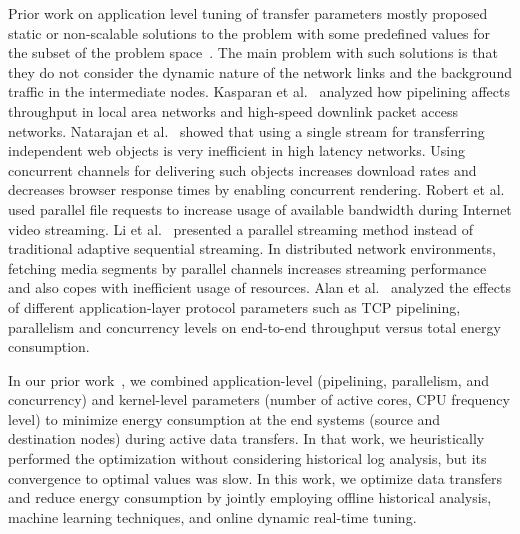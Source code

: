 \documentclass[conference]{IEEEtran}
\begin{document}
Prior work on application level tuning of transfer parameters mostly proposed static or non-scalable solutions to the problem with some predefined values for the subset of the problem space~\cite{R_Hacker02, R_Dinda05}. The main problem with such solutions is that they do not consider the dynamic nature of the network links and the background traffic in the intermediate nodes. 
%
Kasparan et al.~\cite{kaspar2010using} analyzed how pipelining affects throughput in local area networks and high-speed downlink packet access networks. 
%
Natarajan et al.~\cite{natarajan2009multiple} showed that using a single stream for transferring independent web objects is very inefficient in high latency networks. Using concurrent channels for delivering such objects increases download rates and decreases browser response times by enabling concurrent rendering. 
%
Robert et al.~\cite{kuschnig2010improving} used parallel file requests to increase usage of available bandwidth during Internet video streaming. 
%
Li et al.~\cite{liu2011parallel} presented a parallel streaming method instead of traditional adaptive sequential streaming. In distributed network environments, fetching media segments by parallel channels increases streaming performance and also copes with inefficient usage of resources.
%
Alan et al.~\cite{alan2015energy} analyzed the effects of different application-layer protocol parameters such as TCP pipelining, parallelism and concurrency levels on end-to-end throughput versus total energy consumption.

In our prior work~\cite{di2019cross}, we combined application-level (pipelining, parallelism, and concurrency) and kernel-level parameters (number of active cores, CPU frequency level) to minimize energy consumption at the end systems (source and destination nodes) during active data transfers. In that work, we heuristically performed the optimization without considering historical log analysis, but its convergence to optimal values was slow. In this work, we optimize data transfers and reduce energy consumption by jointly employing offline historical analysis, machine learning techniques, and online dynamic real-time tuning.
\end{document}
